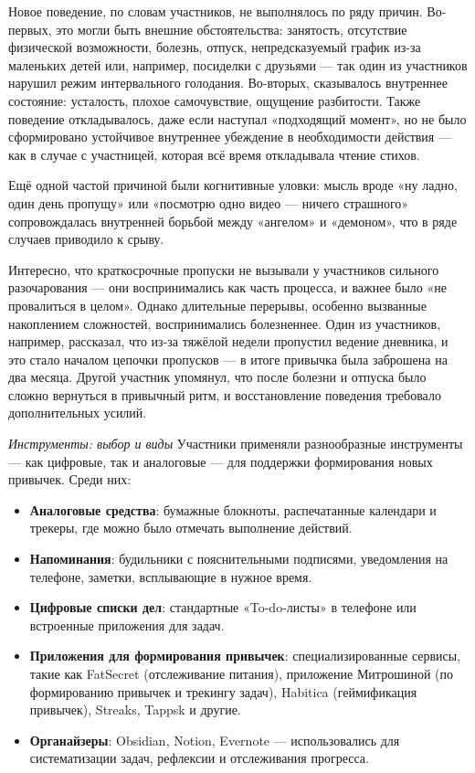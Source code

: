 \documentclass[pdflatex,sn-mathphys-num]{sn-jnl}%
\theoremstyle{thmstyleone}%
\theoremstyle{thmstyletwo}%
\theoremstyle{thmstylethree}%
\begin{document}
Новое поведение, по словам участников, не выполнялось по ряду причин. Во-первых, это могли быть внешние обстоятельства: занятость, отсутствие физической возможности, болезнь, отпуск, непредсказуемый график из-за маленьких детей или, например, посиделки с друзьями — так один из участников нарушил режим интервального голодания. Во-вторых, сказывалось внутреннее состояние: усталость, плохое самочувствие, ощущение разбитости. Также поведение откладывалось, даже если наступал «подходящий момент», но не было сформировано устойчивое внутреннее убеждение в необходимости действия — как в случае с участницей, которая всё время откладывала чтение стихов. 

Ещё одной частой причиной были когнитивные уловки: мысль вроде «ну ладно, один день пропущу» или «посмотрю одно видео — ничего страшного» сопровождалась внутренней борьбой между «ангелом» и «демоном», что в ряде случаев приводило к срыву.

Интересно, что краткосрочные пропуски не вызывали у участников сильного разочарования — они воспринимались как часть процесса, и важнее было «не провалиться в целом». Однако длительные перерывы, особенно вызванные накоплением сложностей, воспринимались болезненнее. Один из участников, например, рассказал, что из-за тяжёлой недели пропустил ведение дневника, и это стало началом цепочки пропусков — в итоге привычка была заброшена на два месяца. Другой участник упомянул, что после болезни и отпуска было сложно вернуться в привычный ритм, и восстановление поведения требовало дополнительных усилий.

\textit{Инструменты: выбор и виды} Участники применяли разнообразные инструменты — как цифровые, так и аналоговые — для поддержки формирования новых привычек. Среди них:

\begin{itemize}
    \item \textbf{Аналоговые средства}: бумажные блокноты, распечатанные календари и трекеры, где можно было отмечать выполнение действий.
    \item \textbf{Напоминания}: будильники с пояснительными подписями, уведомления на телефоне, заметки, всплывающие в нужное время.
    \item \textbf{Цифровые списки дел}: стандартные «To-do-листы» в телефоне или встроенные приложения для задач.
    \item \textbf{Приложения для формирования привычек}: специализированные сервисы, такие как FatSecret (отслеживание питания), приложение Митрошиной (по формированию привычек и трекингу задач), Habitica (геймификация привычек), Streaks, Tappsk и другие.
    \item \textbf{Органайзеры}: Obsidian, Notion, Evernote — использовались для систематизации задач, рефлексии и отслеживания прогресса.
\end{itemize}
\end{document}
